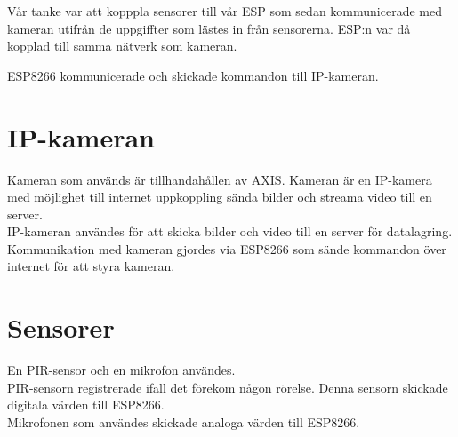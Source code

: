 Vår tanke var att kopppla sensorer till vår ESP som sedan kommunicerade med kameran utifrån de uppgiffter som lästes in från sensorerna. ESP:n var då kopplad till samma nätverk som kameran.

ESP8266 kommunicerade och skickade kommandon till IP-kameran.\\

\section{IP-kameran}
Kameran som används är tillhandahållen av AXIS. Kameran är en IP-kamera med möjlighet till internet uppkoppling sända bilder och streama video till en server.\\

IP-kameran användes för att skicka bilder och video till en server för datalagring.\\

Kommunikation med kameran gjordes via ESP8266 som sände kommandon över internet för att styra kameran.\\

\section{Sensorer}
En PIR-sensor och en mikrofon användes.\\

PIR-sensorn registrerade ifall det förekom någon rörelse. Denna sensorn skickade digitala värden till ESP8266.\\

Mikrofonen som användes skickade analoga värden till ESP8266.\\






 






